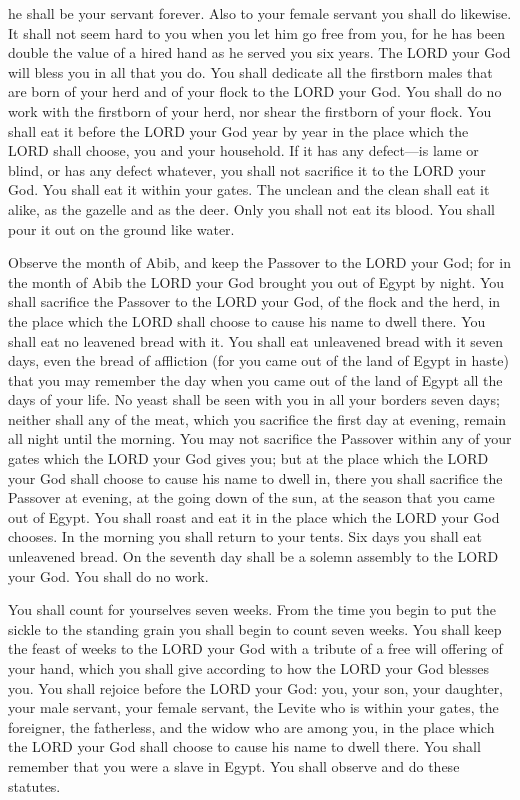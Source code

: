 he shall be your servant forever. Also to your female servant you shall do likewise.
\myverse{}It shall not seem hard to you when you let him go free from you, for he has
been double the value of a hired hand as he served you six years. The LORD your God will bless you in
all that you do.
\myverse{}You shall dedicate all the firstborn males that are born of your herd and
of your flock to the LORD your God. You shall do no work with the firstborn of your herd, nor shear the
firstborn of your flock.
\myverse{}You shall eat it before the LORD your God year by year in the place which
the LORD shall choose, you and your household.
\myverse{}If it has any defect—is lame or blind, or has any defect whatever, you shall
not sacrifice it to the LORD your God.
\myverse{}You shall eat it within your gates. The unclean and the clean shall eat it
alike, as the gazelle and as the deer.
\myverse{}Only you shall not eat its blood. You shall pour it out on the ground like
water.


\mychapter{} \myverse*{}Observe the month of Abib, and keep the Passover to the LORD your
God; for in the month of Abib the LORD your God brought you out of Egypt by night.
\myverse{}You shall sacrifice the Passover to the LORD your God, of the flock and the
herd, in the place which the LORD shall choose to cause his name to dwell there.
\myverse{}You shall eat no leavened bread with it. You shall eat unleavened bread with
it seven days, even the bread of affliction (for you came out of the land of Egypt in haste) that you
may remember the day when you came out of the land of Egypt all the days of your life.
\myverse{}No yeast shall be seen with you in all your borders seven days; neither shall
any of the meat, which you sacrifice the first day at evening, remain all night until the morning.
\myverse{}You may not sacrifice the Passover within any of your gates which the LORD
your God gives you;
\myverse{}but at the place which the LORD your God shall choose to cause his name to
dwell in, there you shall sacrifice the Passover at evening, at the going down of the sun, at the season
that you came out of Egypt.
\myverse{}You shall roast and eat it in the place which the LORD your God chooses. In
the morning you shall return to your tents.
\myverse{}Six days you shall eat unleavened bread. On the seventh day shall be a solemn
assembly to the LORD your God. You shall do no work.


\myverse{}You shall count for yourselves seven weeks. From the time you
begin to put the sickle to the standing grain you shall begin to count seven weeks.
\myverse{}You shall keep the feast of weeks to the LORD your God with a tribute of
a free will offering of your hand, which you shall give according to how the LORD your God blesses you.
\myverse{}You shall rejoice before the LORD your God: you, your son, your daughter,
your male servant, your female servant, the Levite who is within your gates, the foreigner, the fatherless,
and the widow who are among you, in the place which the LORD your God shall choose to cause his name to
dwell there.
\myverse{}You shall remember that you were a slave in Egypt. You shall observe and
do these statutes.


